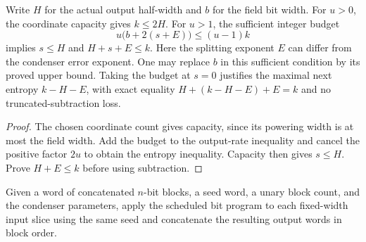 \begin{theorem}
  \label{thm:lowerbounds-algebraic-explicit-pair-split-budget}
  \leanok
  Write $H$ for the actual output half-width and $b$ for the field bit
  width. For $u>0$, the coordinate capacity gives $k\le2H$. For $u>1$,
  the sufficient integer budget
  \[
    u\bigl(b+2(s+E)\bigr)\le(u-1)k
  \]
  implies $s\le H$ and $H+s+E\le k$. Here the splitting exponent $E$
  can differ from the condenser error exponent. One may replace $b$ in
  this sufficient condition by its proved upper bound. Taking the budget
  at $s=0$ justifies the maximal next entropy $k-H-E$, with exact equality
  $H+(k-H-E)+E=k$ and no truncated-subtraction loss.
\end{theorem}
\begin{proof}
  \leanok
  The chosen coordinate count gives capacity, since its powering width is
  at most the field width. Add the budget to the output-rate inequality
  and cancel the positive factor $2u$ to obtain the entropy inequality.
  Capacity then gives $s\le H$. Prove $H+E\le k$ before using subtraction.
\end{proof}

\begin{definition}
  \label{def:lowerbounds-algebraic-explicit-block-program}
  \leanok
  Given a word of concatenated $n$-bit blocks, a seed word, a unary block
  count, and the condenser parameters, apply the scheduled bit program
  to each fixed-width input slice using the same seed and concatenate
  the resulting output words in block order.
\end{definition}

